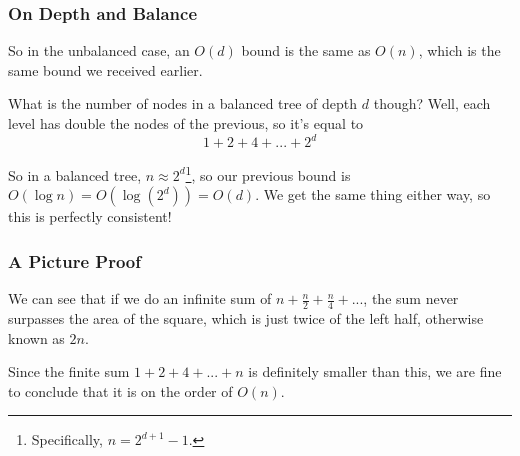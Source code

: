 \documentclass[aspectratio=169]{beamer}
\begin{document}
\begin{frame}[fragile]
  \frametitle{On Depth and Balance}

  \ptmt


  \pause
  \vspace{\fill}

  So in the unbalanced case, an $O(d)$ bound is the same as $O(n)$, which is the same
  bound we received earlier.

  \pause
  \vspace{\fill}

  What is the number of nodes in a balanced tree of depth $d$ though? Well, each level has
  double the nodes of the previous, so it's equal to
  $$1 + 2 + 4 + ... + 2^d$$

  \pause
  \vspace{\fill}


  \pause
  \vspace{\fill}

  So in a balanced tree, $n \approx 2^d$\footnote{Specifically, $n = 2^{d + 1} - 1$.}, so our previous bound is $O(\log n) = O(\log (2^d)) = O(d)$.
  We get the same thing either way, so this is perfectly consistent!
\end{frame}

\begin{frame}[fragile]
  \frametitle{A Picture Proof}

  \begin{center}
  \end{center}

  \pause
  \vspace{\fill}

  We can see that if we do an infinite sum of $n + \frac{n}{2} + \frac{n}{4} + ...$,
  the sum never surpasses the area of the square, which is just twice of the left half,
  otherwise known as $2n$.

  \pause
  \vspace{\fill}

  Since the finite sum $1 + 2 + 4 + ... + n$ is definitely smaller than this, we are
  fine to conclude that it is on the order of $O(n)$.
\end{frame}
\end{document}
